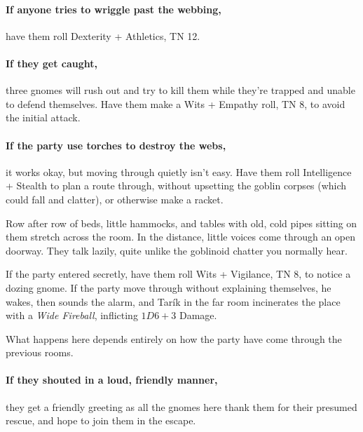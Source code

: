 \begin{multicols}{2}
\paragraph{If anyone tries to wriggle past the webbing,}
have them roll Dexterity + Athletics, TN 12.

\paragraph{If they get caught,}
three gnomes will rush out and try to kill them while they're trapped and unable to defend themselves.
Have them make a Wits + Empathy roll, TN 8, to avoid the initial attack.

\paragraph{If the party use torches to destroy the webs,}
it works okay, but moving through quietly isn't easy.
Have them roll Intelligence + Stealth to plan a route through, without upsetting the goblin corpses (which could fall and clatter), or otherwise make a racket.


\begin{boxtext}

	Row after row of beds, little hammocks, and tables with old, cold pipes sitting on them stretch across the room.
	In the distance, little voices come through an open doorway.
	They talk lazily, quite unlike the goblinoid chatter you normally hear.

\end{boxtext}

If the party entered secretly, have them roll Wits + Vigilance, TN 8, to notice a dozing gnome.
If the party move through without explaining themselves, he wakes, then sounds the alarm, and Tar\'ik in the far room incinerates the place with a \textit{Wide Fireball}, inflicting $1D6 +3$ Damage.


What happens here depends entirely on how the party have come through the previous rooms.

\paragraph{If they shouted in a loud, friendly manner,}
they get a friendly greeting as all the gnomes here thank them for their presumed rescue, and hope to join them in the escape.


\end{multicols}

